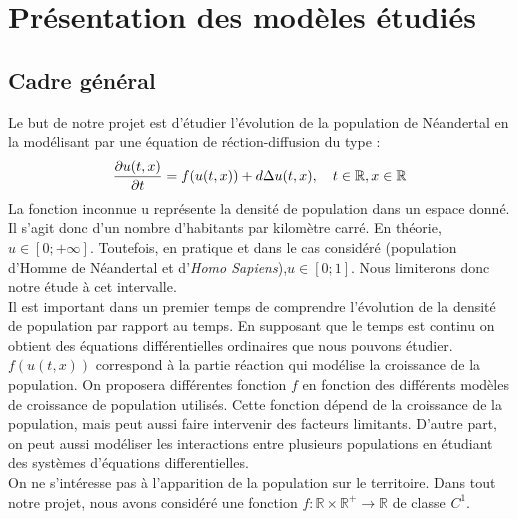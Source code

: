 \documentclass[a4paper,11pt]{article}
\begin{document}
\section{Présentation des modèles étudiés}
\subsection{Cadre général}
Le but de notre projet est d'étudier l'évolution de la population de Néandertal en la modélisant par une équation de réction-diffusion du type : \\
\begin{equation}
\frac{\partial u(t,x)}{\partial t}=f(u(t,x))+d\Delta u(t,x), \quad t \in \mathbb{R}, x \in \mathbb{R} \\
\end{equation}
La fonction inconnue u représente la densité de population dans un espace donné. Il s'agit donc d'un nombre d'habitants par kilomètre carré. En théorie, $u\in [0;+\infty]$. Toutefois, en pratique et dans le cas considéré (population d'Homme de Néandertal et d'\textit{Homo Sapiens}),$u\in [0;1]$. Nous limiterons donc notre étude à cet intervalle.\\
\newline
Il est important dans un premier temps de comprendre l'évolution de la densité de population par rapport au temps. En supposant que le temps est continu on obtient des équations différentielles ordinaires que nous pouvons étudier. $f(u(t,x))$ correspond à la partie réaction qui modélise la croissance de la population. On proposera différentes fonction $f$ en fonction des différents modèles de croissance de population utilisés. Cette fonction dépend de la croissance de la population, mais peut aussi faire intervenir des facteurs limitants. D'autre part, on peut aussi modéliser les interactions entre plusieurs populations en étudiant des systèmes
d'équations differentielles.\\
\newline
On ne s'intéresse pas à l'apparition de la population sur le territoire. Dans tout notre projet, nous avons considéré une fonction $f: \mathbb{R} \times \mathbb{R}^+ \to \mathbb{R}$  de classe $C^1$. \\
\end{document}
